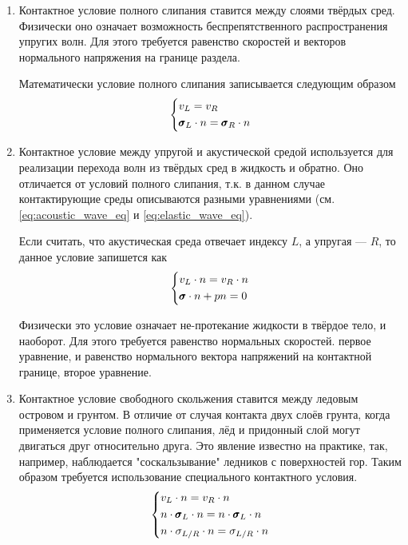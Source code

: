 \begin{enumerate}
    \item Контактное условие полного слипания ставится между слоями твёрдых сред. Физически оно означает возможность беспрепятственного распространения упругих волн. Для этого требуется равенство скоростей и векторов нормального напряжения на границе раздела.
    
    Математически условие полного слипания записывается следующим образом
    \begin{equation}
    \begin{dcases}
        v_L = v_R \\
        \pmb{\sigma}_L \cdot n = \pmb{\sigma}_R \cdot n
    \end{dcases}
    \end{equation}
    
    \item Контактное условие между упругой и акустической средой используется для реализации перехода волн из твёрдых сред в жидкость и обратно. Оно отличается от условий полного слипания, т.к. в данном случае контактирующие среды описываются разными уравнениями (см. \eqref{eq:acoustic_wave_eq} и  \eqref{eq:elastic_wave_eq}).
    
    Если считать, что акустическая среда отвечает индексу $L$, а упругая --- $R$, то данное условие запишется как
    \begin{equation}
    \begin{dcases}
        v_L \cdot n = v_R \cdot n \\
        \pmb{\sigma} \cdot n + p n = 0
    \end{dcases}
    \end{equation}
    
    Физически это условие означает не-протекание жидкости в твёрдое тело, и наоборот. Для этого требуется равенство нормальных скоростей. первое уравнение, и равенство нормального вектора напряжений на контактной границе, второе уравнение.
    
    \item Контактное условие свободного скольжения ставится между ледовым островом и грунтом. В отличие от случая контакта двух слоёв грунта, когда применяется условие полного слипания, лёд и придонный слой могут двигаться друг относительно друга. Это явление известно на практике, так, например, наблюдается "соскальзывание" ледников с поверхностей гор. Таким образом требуется использование специального контактного условия.
    \begin{equation}
    \begin{dcases}
        v_L \cdot n = v_R \cdot n \\
        n \cdot \pmb{\sigma}_L \cdot n = n \cdot \pmb{\sigma}_L \cdot n \\
        n \cdot \sigma_{L/R} \cdot n = \sigma_{L/R} \cdot n
    \end{dcases}
    \end{equation}


\end{enumerate}
